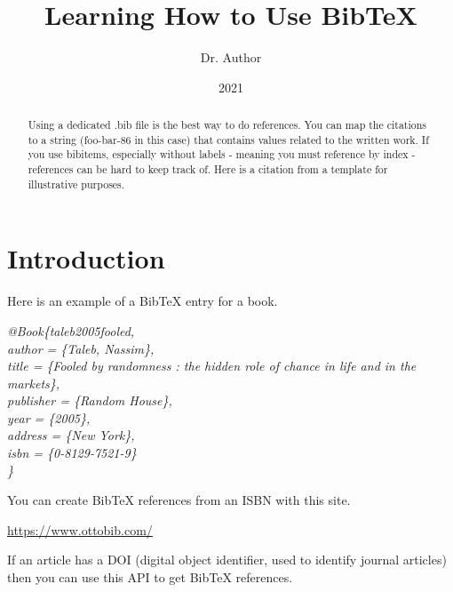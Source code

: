 \documentclass[hidelinks, 11pt, twocolumn]{article}
\begin{document}
\title{\textbf{Learning How to Use BibTeX}}
\author{Dr. Author}
\date{2021}
\maketitle


\tableofcontents

\begin{abstract}

	Using a dedicated .bib file is the best way to do references.
	You can map the citations to a string (foo-bar-86 in this case) that contains values related to the written work.
	If you use bibitems, especially without labels - meaning you must reference by index - references can be hard to keep track of.
	Here is a citation from a template for illustrative purposes.
	\cite{foo-bar-86}

\end{abstract}
\pagebreak


\section{Introduction}


Here is an example of a BibTeX entry for a book.

\begin{flushleft}
	\textit{@Book\{taleb2005fooled,}\\
	\hspace{1em} \textit{author = \{Taleb, Nassim\},}\\
	\hspace{1em} \textit{title = \{Fooled by randomness : the hidden role of chance in life and in the markets\},}\\
	\hspace{1em} \textit{publisher = \{Random House\},}\\
	\hspace{1em} \textit{year = \{2005\},}\\
	\hspace{1em} \textit{address = \{New York\},}\\
	\hspace{1em} \textit{isbn = \{0-8129-7521-9\}}\\
	\textit{\}}
\end{flushleft}

You can create BibTeX references from an ISBN with this site.

\url{https://www.ottobib.com/}

If an article has a DOI (digital object identifier, used to identify journal articles) then you can use this API to get BibTeX references.
\end{document}
